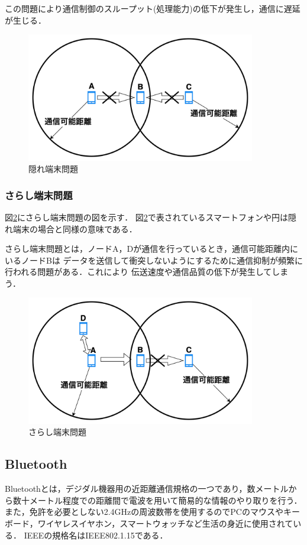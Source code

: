 \documentclass[a4paper, 11pt]{ltjsarticle}
\begin{document}
この問題により通信制御のスループット(処理能力)の低下が発生し，通信に遅延が生じる．
\begin{figure}[H]
  \centering
  \includegraphics[width=100mm]{hidden_terminal_problem.png}
  \caption{隠れ端末問題}
  \label{hidden_problem}
\end{figure}

\subsubsection{さらし端末問題}
図\ref{exposed_problem}にさらし端末問題の図を示す．
図\ref{exposed_problem}で表されているスマートフォンや円は隠れ端末の場合と同様の意味である．

さらし端末問題とは，ノードA，Dが通信を行っているとき，通信可能距離内にいるノードBは
データを送信して衝突しないようにするために通信抑制が頻繁に行われる問題がある．これにより
伝送速度や通信品質の低下が発生してしまう．
\begin{figure}[H]
  \centering
  \includegraphics[width=100mm]{exposed_terminal_problem.png}
  \caption{さらし端末問題}
  \label{exposed_problem}
\end{figure}

\clearpage
\subsection{Bluetooth}
Bluetoothとは，デジダル機器用の近距離通信規格の一つであり，数メートルから数十メートル程度での距離間で電波を用いて簡易的な情報のやり取りを行う．
また，免許を必要としない2.4GHzの周波数帯を使用するのでPCのマウスやキーボード，ワイヤレスイヤホン，スマートウォッチなど生活の身近に使用されている．
IEEEの規格名はIEEE802.1.15である．
\end{document}
